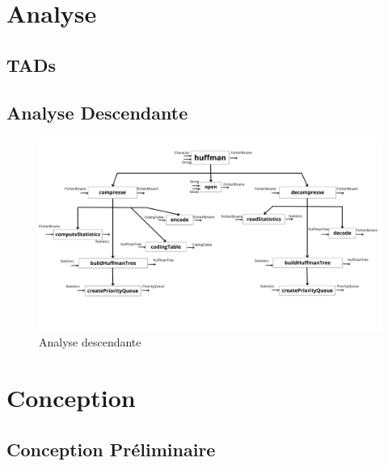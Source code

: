 \documentclass[12pt]{article}
\begin{document}


\newpage

\tableofcontents

\listoffigures


\newpage
\section{Analyse}

\subsection{TADs}







\subsection{Analyse Descendante}

\begin{figure}
    \centering
    \includegraphics[width=\textwidth]{parties/analyse/Analyse descendante/huffman.png}
    \caption{Analyse descendante}
\end{figure}

\section{Conception}

\subsection{Conception Préliminaire}





\end{document}
